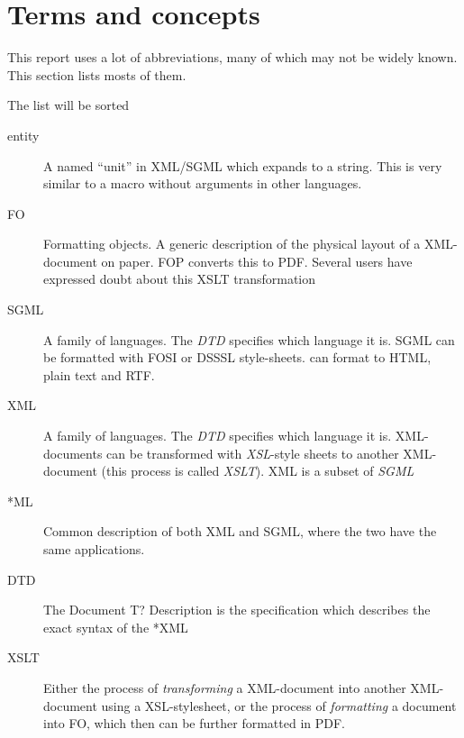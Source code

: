
\chapter{Terms and concepts}
\label{cha:terms-and-concepts}



This report uses a lot of abbreviations, many of which may not be
widely known.  This section lists mosts of them.


\textsf{The list will be sorted}
\begin{description}

\item[entity] A named ``unit'' in XML/SGML which expands to a string.
  This is very similar to a macro without arguments in other
  languages.
  
\item[FO] Formatting objects.  A generic description of the physical
  layout of a XML-document on paper.  FOP converts this to PDF.
  \textsf{Several users have expressed doubt about this XSLT
    transformation}
  
\item[SGML] A family of languages.  The \textit{DTD} specifies which
  language it is.  SGML can be formatted with FOSI or DSSSL
  style-sheets.   can format to HTML, plain text and
  RTF. 
  
\item[XML] A family of languages.  The \textit{DTD} specifies which
  language it is.  XML-documents can be transformed with
  \textit{XSL}-style sheets to another XML-document (this process is
  called \textit{XSLT}).  XML is a subset of \textit{SGML}


\item[*ML] Common description of both XML and SGML, where the two have
  the same applications.

\item[DTD] The \textsf{Document T? Description} is the specification
  which describes the exact syntax of the *XML


\item[XSLT] Either the process of \textit{transforming} a XML-document into
  another XML-document using a XSL-stylesheet, or the process of
  \textit{formatting} a document into FO, which then can be further
  formatted in PDF.


\end{description}
